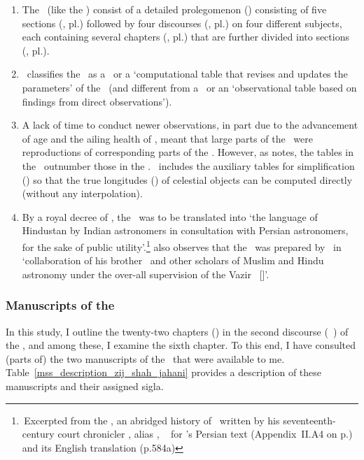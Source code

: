 \begin{enumerate}[topsep=0pt]
    \item The \ZijiShahJahani\ (like the \ZijUlughBeg) consist of a detailed prolegomenon (\muqaddima) consisting of five sections (\qism, pl.\thinspace \aqsam) followed by four discourses (\maqala, pl.\thinspace\maqalat) on four different subjects, each containing several chapters (\bab, pl.\thinspace \biban) that are further divided into sections (\fasl, pl.\thinspace\fusul).
    \item \MullaFarid\ classifies the \ZijiShahJahani\ as a \zijiHisabi\ or a `computational table that revises and updates the parameters' of the \ZijUlughBeg\ (and different from a \zijiRasadi\ or an `observational table based on findings from direct observations').
    \item A lack of time to conduct newer observations, in part due to the advancement of age and the ailing health of \MullaFarid, meant that large parts of the \ZijiShahJahani\ were reproductions of corresponding parts of the \ZijUlughBeg. However, as \textcite[585]{Ansarisurvey} notes, the tables in the \ZijiShahJahani\ outnumber those in the \ZijUlughBeg. \MullaFarid\ includes the auxiliary tables for simplification (\tashil) so that the true longitudes (\taqvim) of celestial objects can be computed directly (without any interpolation). 
    \item By a royal decree of \Shahjahan, the \ZijiShahJahani\ was to be translated into `the language of Hindustan by Indian astronomers in consultation with Persian astronomers, for the sake of public utility'.\footnote{\,Excerpted from the \MulakhkhasiShahJahanNama, an abridged history of \Shahjahan\  written by his seventeenth-century court chronicler \TahirKhan, alias \InayatKhan, \vid\ \textcite{Ansarisurvey} for \TahirKhan's Persian text (Appendix~II.\thinspace A4 on p.) and its English translation (p.\thinspace 584a)} \textcite[34]{Ghori} also observes that the \ZijiShahJahani\ was prepared by \MullaFarid\ in `collaboration of his brother \MullaTayyib\ and other scholars of Muslim and Hindu astronomy under the over-all supervision of the Vazir \AsifKhan\ [\sic]'.     
\end{enumerate}

\subsubsection{Manuscripts of the \ZijUlughBeg}\label{manuscripts_zij_shahjahani}
In this study, I outline the twenty-two chapters (\biban) in the second discourse (\maqala\idafaconsonant\ \duvum) of the \ZijiShahJahani, and among these, I examine the sixth chapter. To this end, I have consulted (parts of) the two manuscripts of the \ZijiShahJahani\ that were available to me. Table~\ref{mss_description_zij_shah_jahani} provides a description of these manuscripts and their assigned sigla.

